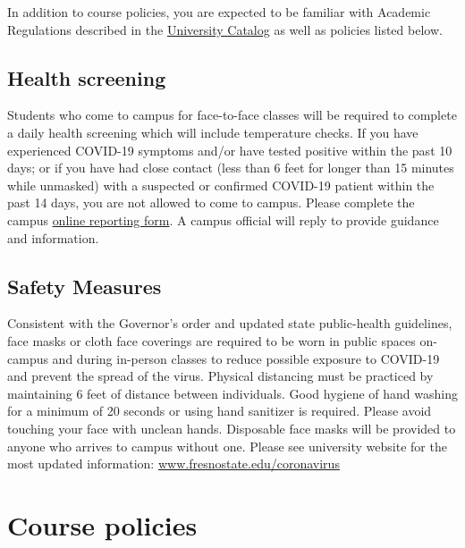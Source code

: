 In addition to course policies, you are expected to be familiar with
Academic Regulations described in the
\href{http://www.fresnostate.edu/catalog/academic-regulations/}{University
Catalog} as well as policies listed below.

\hypertarget{health-screening}{%
\subsection{Health screening}\label{health-screening}}

Students who come to campus for face-to-face classes will be required to
complete a daily health screening which will include temperature checks.
If you have experienced COVID-19 symptoms and/or have tested positive
within the past 10 days; or if you have had close contact (less than 6
feet for longer than 15 minutes while unmasked) with a suspected or
confirmed COVID-19 patient within the past 14 days, you are not allowed
to come to campus. Please complete the campus
\href{https://fresnostate.co1.qualtrics.com/jfe/form/SV_3faIAsuC8CzuFjD?Q_FormSessionID=FS_UFJ902LXgDJbKeZ}{online
reporting form}. A campus official will reply to provide guidance and
information.

\hypertarget{safety-measures}{%
\subsection{Safety Measures}\label{safety-measures}}

Consistent with the Governor's order and updated state public-health
guidelines, face masks or cloth face coverings are required to be worn
in public spaces on-campus and during in-person classes to reduce
possible exposure to COVID-19 and prevent the spread of the virus.
Physical distancing must be practiced by maintaining 6 feet of distance
between individuals. Good hygiene of hand washing for a minimum of 20
seconds or using hand sanitizer is required. Please avoid touching your
face with unclean hands. Disposable face masks will be provided to
anyone who arrives to campus without one. Please see university website
for the most updated information:
\href{http://www.fresnostate.edu/president/coronavirus/index.html}{www.fresnostate.edu/coronavirus}

\hypertarget{course-policies}{%
\section{Course policies}\label{course-policies}}

